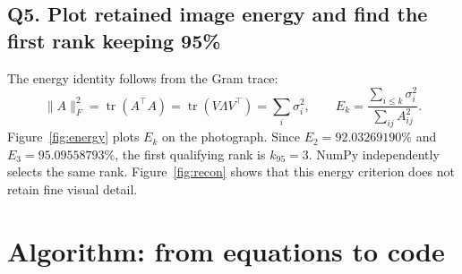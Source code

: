 \documentclass[11pt,letterpaper]{article}
\numberwithin{equation}{section}
\newcommand{\tr}{\operatorname{tr}}
\begin{document}
\subsection*{Q5. Plot retained image energy and find the first rank keeping 95\%}
The energy identity follows from the Gram trace:
\begin{equation}\label{eq:energy}
\|A\|_F^2=\tr(A^\top A)=\tr(V\Lambda V^\top)
=\sum_i\sigma_i^2,\qquad
E_k=\frac{\sum_{i\le k}\sigma_i^2}{\sum_{ij}A_{ij}^2}.
\end{equation}
Figure~\ref{fig:energy} plots $E_k$ on the photograph. Since $E_2=92.03269190\%$ and $E_3=95.09558793\%$, the first qualifying rank is $\boxed{k_{95}=3}$. NumPy independently selects the same rank. Figure~\ref{fig:recon} shows that this energy criterion does not retain fine visual detail.


\section{Algorithm: from equations to code}\label{sec:algo}
\end{document}
